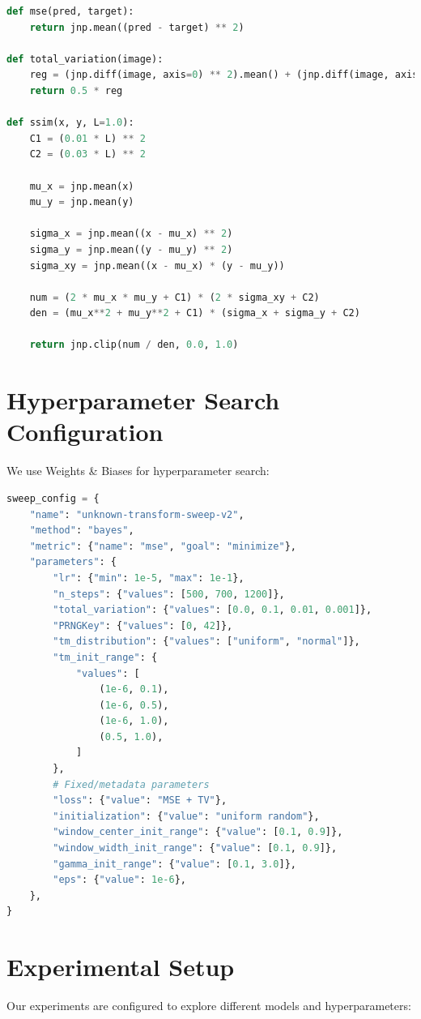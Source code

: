 \documentclass[nomenclature, english, bibtex]{kththesis}
\numberwithin{listing}{chapter}
\begin{document}
\begin{lstlisting}[language=Python, caption=Loss functions and metrics]
def mse(pred, target):
    return jnp.mean((pred - target) ** 2)

def total_variation(image):
    reg = (jnp.diff(image, axis=0) ** 2).mean() + (jnp.diff(image, axis=1) ** 2).mean()
    return 0.5 * reg

def ssim(x, y, L=1.0):
    C1 = (0.01 * L) ** 2
    C2 = (0.03 * L) ** 2

    mu_x = jnp.mean(x)
    mu_y = jnp.mean(y)

    sigma_x = jnp.mean((x - mu_x) ** 2)
    sigma_y = jnp.mean((y - mu_y) ** 2)
    sigma_xy = jnp.mean((x - mu_x) * (y - mu_y))

    num = (2 * mu_x * mu_y + C1) * (2 * sigma_xy + C2)
    den = (mu_x**2 + mu_y**2 + C1) * (sigma_x + sigma_y + C2)

    return jnp.clip(num / den, 0.0, 1.0)
\end{lstlisting}

\section{Hyperparameter Search Configuration}
We use Weights \& Biases for hyperparameter search:

\begin{lstlisting}[language=Python, caption=Hyperparameter sweep configuration]
sweep_config = {
    "name": "unknown-transform-sweep-v2",
    "method": "bayes",
    "metric": {"name": "mse", "goal": "minimize"},
    "parameters": {
        "lr": {"min": 1e-5, "max": 1e-1},
        "n_steps": {"values": [500, 700, 1200]},
        "total_variation": {"values": [0.0, 0.1, 0.01, 0.001]},
        "PRNGKey": {"values": [0, 42]},
        "tm_distribution": {"values": ["uniform", "normal"]},
        "tm_init_range": {
            "values": [
                (1e-6, 0.1),
                (1e-6, 0.5),
                (1e-6, 1.0),
                (0.5, 1.0),
            ]
        },
        # Fixed/metadata parameters
        "loss": {"value": "MSE + TV"},
        "initialization": {"value": "uniform random"},
        "window_center_init_range": {"value": [0.1, 0.9]},
        "window_width_init_range": {"value": [0.1, 0.9]},
        "gamma_init_range": {"value": [0.1, 3.0]},
        "eps": {"value": 1e-6},
    },
}
\end{lstlisting}

\section{Experimental Setup}
Our experiments are configured to explore different models and hyperparameters:
\end{document}
